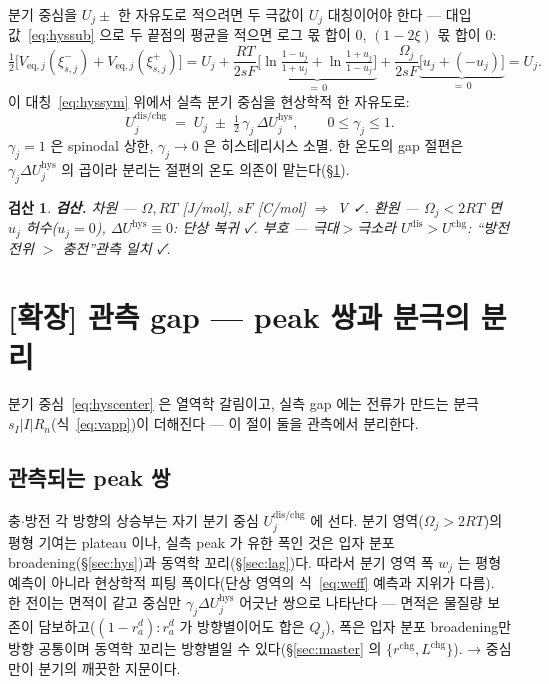 \documentclass[11pt,a4paper]{article}
\newtheorem*{verifybox}{검산}
\newcommand{\eq}{\mathrm{eq}}
\newcommand{\dis}{\mathrm{dis}}
\newcommand{\chg}{\mathrm{chg}}
\newcommand{\hys}{\mathrm{hys}}
\begin{document}
분기 중심을 $U_j\pm$ 한 자유도로 적으려면 두 극값이 $U_j$ 대칭이어야 한다 — 대입값~\eqref{eq:hyssub} 으로 두 끝점의 평균을 적으면 로그 몫 합이 $0$, $(1-2\xi)$ 몫 합이 $0$:
\begin{equation}
\tfrac12\big[V_{\eq,j}(\xi_{s,j}^-)+V_{\eq,j}(\xi_{s,j}^+)\big]
=U_j+\frac{RT}{2sF}
\underbrace{\Big[\ln\tfrac{1-u_j}{1+u_j}+\ln\tfrac{1+u_j}{1-u_j}\Big]}_{=\,0}
+\frac{\Omega_j}{2sF}\underbrace{\big[u_j+(-u_j)\big]}_{=\,0}
=U_j.
\label{eq:hyssym}
\end{equation}
이 대칭~\eqref{eq:hyssym} 위에서 실측 분기 중심을 현상학적 한 자유도로:
\begin{equation}
U_j^{\dis/\chg}\;=\;U_j\;\pm\;\tfrac12\,\gamma_j\,\Delta U_j^\hys,
\qquad 0\le\gamma_j\le1.
\label{eq:hyscenter}
\end{equation}
$\gamma_j=1$ 은 spinodal 상한, $\gamma_j\to0$ 은 히스테리시스 소멸. 한 온도의 gap 절편은 $\gamma_j\Delta U_j^\hys$ 의 곱이라 분리는 절편의 온도 의존이 맡는다(\S\ref{sec:hyspol}).

\begin{verifybox}
\textbf{검산.} 차원 — $\Omega,RT$ [J/mol], $sF$ [C/mol] $\Rightarrow$ V ✓. 환원 — $\Omega_j<2RT$ 면 $u_j$ 허수($u_j=0$), $\Delta U^\hys\equiv0$: 단상 복귀 ✓. 부호 — 극대$>$극소라 $U^{\dis}>U^{\chg}$: ``방전 전위 $>$ 충전''관측 일치 ✓.
\end{verifybox}

\section{[확장] 관측 gap — peak 쌍과 분극의 분리}\label{sec:hyspol}
분기 중심~\eqref{eq:hyscenter} 은 열역학 갈림이고, 실측 gap 에는 전류가 만드는 분극 $s_I|I|R_n$(식~\eqref{eq:vapp})이 더해진다 — 이 절이 둘을 관측에서 분리한다.

\subsection{관측되는 peak 쌍}\label{sec:hyspeak}
충$\cdot$방전 각 방향의 상승부는 자기 분기 중심 $U_j^{\dis/\chg}$ 에 선다. 분기 영역($\Omega_j>2RT$)의 평형 기여는 plateau 이나, 실측 peak 가 유한 폭인 것은 입자 분포 broadening(\S\ref{sec:hys})과 동역학 꼬리(\S\ref{sec:lag})다. 따라서 분기 영역 폭 $w_j$ 는 평형 예측이 아니라 현상학적 피팅 폭이다(단상 영역의 식~\eqref{eq:weff} 예측과 지위가 다름). 한 전이는 면적이 같고 중심만 $\gamma_j\Delta U_j^\hys$ 어긋난 쌍으로 나타난다 — 면적은 물질량 보존이 담보하고($(1-r_a^d):r_a^d$ 가 방향별이어도 합은 $Q_j$), 폭은 입자 분포 broadening만 방향 공통이며 동역학 꼬리는 방향별일 수 있다(\S\ref{sec:master} 의 $\{r^{\chg},L^{\chg}\}$). → 중심만이 분기의 깨끗한 지문이다.
\end{document}

